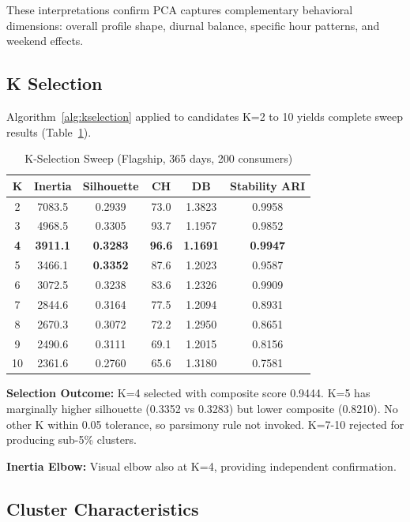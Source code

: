 These interpretations confirm PCA captures complementary behavioral dimensions: overall profile shape, diurnal balance, specific hour patterns, and weekend effects.

\subsection{K Selection}

Algorithm~\ref{alg:kselection} applied to candidates K=2 to 10 yields complete sweep results (Table~\ref{tab:k_sweep}).

\begin{table}[h]
\centering
\small
\caption{K-Selection Sweep (Flagship, 365 days, 200 consumers)}
\label{tab:k_sweep}
\begin{tabular}{@{}cccccc@{}}
\toprule
K & Inertia & Silhouette & CH & DB & Stability ARI \\
\midrule
2 & 7083.5 & 0.2939 & 73.0 & 1.3823 & 0.9958 \\
3 & 4968.5 & 0.3305 & 93.7 & 1.1957 & 0.9852 \\
\textbf{4} & \textbf{3911.1} & \textbf{0.3283} & \textbf{96.6} & \textbf{1.1691} & \textbf{0.9947} \\
5 & 3466.1 & \textbf{0.3352} & 87.6 & 1.2023 & 0.9587 \\
6 & 3072.5 & 0.3238 & 83.6 & 1.2326 & 0.9909 \\
7 & 2844.6 & 0.3164 & 77.5 & 1.2094 & 0.8931 \\
8 & 2670.3 & 0.3072 & 72.2 & 1.2950 & 0.8651 \\
9 & 2490.6 & 0.3111 & 69.1 & 1.2015 & 0.8156 \\
10 & 2361.6 & 0.2760 & 65.6 & 1.3180 & 0.7581 \\
\bottomrule
\end{tabular}
\end{table}

\textbf{Selection Outcome:} K=4 selected with composite score 0.9444. K=5 has marginally higher silhouette (0.3352 vs 0.3283) but lower composite (0.8210). No other K within 0.05 tolerance, so parsimony rule not invoked. K=7-10 rejected for producing sub-5\% clusters.

\textbf{Inertia Elbow:} Visual elbow also at K=4, providing independent confirmation.

\subsection{Cluster Characteristics}

